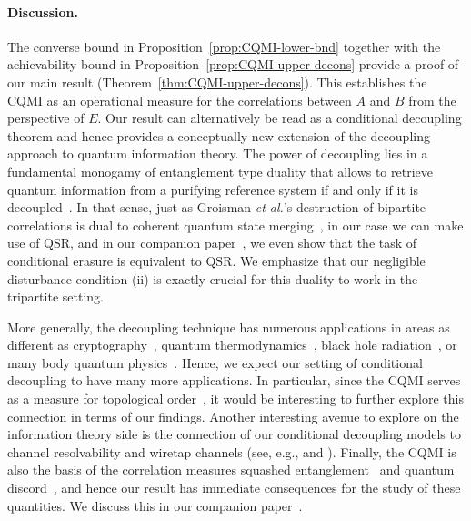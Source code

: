 \documentclass[a4paper,aps,prl,twocolumn,10pt,superscriptaddress]{revtex4-1}
\theoremstyle{plain}
\theoremstyle{definition}
\begin{document}

\paragraph{Discussion.} The converse bound in Proposition~\ref{prop:CQMI-lower-bnd} together with the achievability bound in Proposition~\ref{prop:CQMI-upper-decons} provide a proof of our main result (Theorem~\ref{thm:CQMI-upper-decons}). This establishes the CQMI as an operational measure for the correlations between $A$ and $B$ from the perspective of $E$. Our result can alternatively be read as a conditional decoupling theorem and hence provides a conceptually new extension of the decoupling approach to quantum information theory. The power of decoupling lies in a fundamental monogamy of entanglement type duality that allows to retrieve quantum information from a purifying reference system if and only if it is decoupled~\cite{qip2002schu,horodecki05,qcap2008first,dupuis10,dupuis09}. In that sense, just as Groisman {\it et al.}'s destruction of bipartite correlations is dual to coherent quantum state merging~\cite{ADHW06FQSW,bertachristandl11,MBDRC16}, in our case we can make use of QSR, and in our companion paper~\cite{BBMW_full16}, we even show that the task of conditional erasure is equivalent to QSR. We emphasize that our negligible disturbance condition (ii) is exactly crucial for this duality to work in the tripartite setting.

More generally, the decoupling technique has numerous applications in areas as different as cryptography~\cite{Berta14}, quantum thermodynamics~\cite{RARDV10,Aberg13}, black hole radiation~\cite{HayPre07,braunstein-pati,braunstein-zyczkowski}, or many body quantum physics~\cite{Brandao12}. Hence, we expect our setting of conditional decoupling to have many more applications. In particular, since the CQMI serves as a measure for topological order~\cite{PK06,LW06,kim13}, it would be interesting to further explore this connection in terms of our findings. Another interesting avenue to explore on the information theory side is the connection of our conditional decoupling models to channel resolvability and wiretap channels (see, e.g., \cite{Hayashi2015} and \cite[Sect.~9.4 \& 9.5]{Hayashi2017}). Finally, the CQMI is also the basis of the correlation measures squashed entanglement~\cite{CW04} and quantum discord~\cite{zurek01}, and hence our result has immediate consequences for the study of these quantities. We discuss this in our companion paper~\cite{BBMW_full16}.
\end{document}
